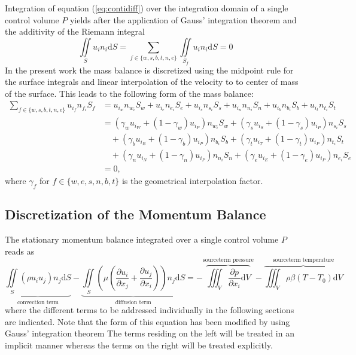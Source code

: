     Integration of equation (\ref{eq:contidiff}) over the integration domain of a single control volume \(P\) yields after the application of Gauss' integration theorem and the additivity of the Riemann integral
    \begin{displaymath}
      \iint\limits_S  u_i n_i \mathrm{d}S = \sum_{f \in \{w,s,b,t,n,e\}} \iint\limits_{S_f}  u_i n_{i} \mathrm{d}S = 0
    \end{displaymath}
    In the present work the mass balance is discretized using the midpoint rule for the surface integrals and linear interpolation of the velocity to to center of mass of the surface. This leads to the following form of the mass balance: 
    \begin{align*}
      \sum_{f \in \{w,s,b,t,n,e\}} u_{i_f} n_{f_i} S_f 
      &= u_{i_w} n_{w_i} S_w + u_{i_e} n_{e_i} S_e 
       + u_{i_s} n_{s_i} S_s + u_{i_n} n_{n_i} S_n 
       + u_{i_b} n_{b_i} S_b + u_{i_t} n_{t_i} S_t  \\
      &= ( \gamma_w u_{i_W} + (1 - \gamma_w ) u_{i_P} ) n_{w_i} S_w + ( \gamma_s u_{i_S} + (1 - \gamma_s ) u_{i_P} ) n_{s_i} S_s \\
      &\quad + ( \gamma_b u_{i_B} + (1 - \gamma_b ) u_{i_P} ) n_{b_i} S_b + ( \gamma_t u_{i_T} + (1 - \gamma_t ) u_{i_P} ) n_{t_i} S_t \\
      &\quad + ( \gamma_n u_{i_N} + (1 - \gamma_n ) u_{i_P} ) n_{n_i} S_n + ( \gamma_e u_{i_E} + (1 - \gamma_e ) u_{i_P} ) n_{e_i} S_e \\
      & =  0,
    \end{align*}
    where \( \gamma_f \) for \( f \in \{w,e,s,n,b,t\} \) is the geometrical interpolation factor.

    \subsection{Discretization of the Momentum Balance}

      The stationary momentum balance integrated over a single control volume \(P\) reads as
      \begin{displaymath}
        \underbrace{\iint\limits_S (\rho u_i u_j)n_j \mathrm{d}S}_{\text{convection term}}
        - \underbrace{\iint\limits_S \left(\mu \left( \frac{\partial u_i}{\partial x_j} + \frac{\partial u_j}{\partial x_i}\right)\right)n_j \mathrm{d}S}_{\text{diffusion term}}
        = - \overbrace{\iiint_V \frac{\partial p}{\partial x_i} \mathrm{d}V}^{\text{sourceterm pressure}}
        - \overbrace{\iiint_V \rho \beta \left(T - T_0\right) \mathrm{d}V}^{\text{sourceterm temperature}}
      \end{displaymath}
      where the different terms to be addressed individually in the following sections are indicated. Note that the form of this equation has been modified by using Gauss' integration theorem The terms residing on the left will be treated in an implicit manner whereas the terms on the right will be treated explicitly. 


